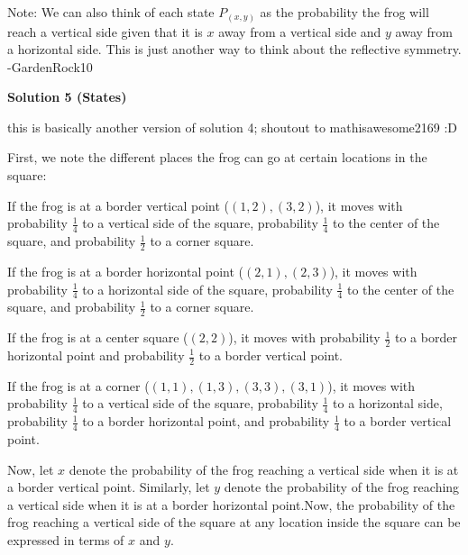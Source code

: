 \begin{enumerate}
 Note: We can also think of each state $P_{(x,y)}$ as the probability the frog will reach a vertical side given that it is $x$ away from a vertical side and $y$ away from a horizontal side. This is just another way to think about the reflective symmetry. -GardenRock10

 



\textbf{Solution 5 (States)}

this is basically another version of solution 4; shoutout to mathisawesome2169 :D

 First, we note the different places the frog can go at certain locations in the square:

 If the frog is at a border vertical point ($(1,2),(3,2)$), it moves with probability $\frac{1}{4}$ to a vertical side of the square, probability $\frac{1}{4}$ to the center of the square, and probability $\frac{1}{2}$ to a corner square.

 If the frog is at a border horizontal point ($(2,1),(2,3)$), it moves with probability $\frac{1}{4}$ to a horizontal side of the square, probability $\frac{1}{4}$ to the center of the square, and probability $\frac{1}{2}$ to a corner square.

 If the frog is at a center square ($(2,2)$), it moves with probability $\frac{1}{2}$ to a border horizontal point and probability $\frac{1}{2}$ to a border vertical point.

 If the frog is at a corner ($(1,1),(1,3),(3,3),(3,1)$), it moves with probability $\frac{1}{4}$ to a vertical side of the square, probability $\frac{1}{4}$ to a horizontal side, probability $\frac{1}{4}$ to a border horizontal point, and probability $\frac{1}{4}$ to a border vertical point.

 Now, let $x$ denote the probability of the frog reaching a vertical side when it is at a border vertical point. Similarly, let $y$ denote the probability of the frog reaching a vertical side when it is at a border horizontal point.Now, the probability of the frog reaching a vertical side of the square at any location inside the square can be expressed in terms of $x$ and $y$.


\end{enumerate}

